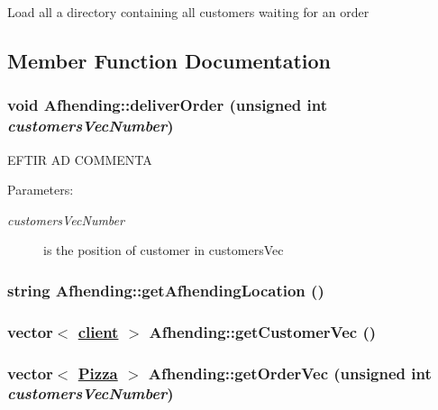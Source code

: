 Load all a directory containing all customers waiting for an order 

\subsection{Member Function Documentation}
\hypertarget{class_afhending_1d223b1559fc42935dfef28841735951}{
\subsubsection[deliverOrder]{\setlength{\rightskip}{0pt plus 5cm}void Afhending::deliver\-Order (unsigned int {\em customers\-Vec\-Number})}}
\label{class_afhending_1d223b1559fc42935dfef28841735951}


EFTIR AD  COMMENTA

\begin{Desc}
\item[Parameters:]
\begin{description}
\item[{\em customers\-Vec\-Number}]is the position of customer in customers\-Vec \end{description}
\end{Desc}
\hypertarget{class_afhending_543bc751e47e95a5382a13e161387a1b}{
\subsubsection[getAfhendingLocation]{\setlength{\rightskip}{0pt plus 5cm}string Afhending::get\-Afhending\-Location ()}}
\label{class_afhending_543bc751e47e95a5382a13e161387a1b}


\hypertarget{class_afhending_3970b0afe27b514282442b11592e1602}{
\subsubsection[getCustomerVec]{\setlength{\rightskip}{0pt plus 5cm}vector$<$ \hyperlink{classclient}{client} $>$ Afhending::get\-Customer\-Vec ()}}
\label{class_afhending_3970b0afe27b514282442b11592e1602}


\hypertarget{class_afhending_ad0cbeddec394b25c5eade57247f4110}{
\subsubsection[getOrderVec]{\setlength{\rightskip}{0pt plus 5cm}vector$<$ \hyperlink{class_pizza}{Pizza} $>$ Afhending::get\-Order\-Vec (unsigned int {\em customers\-Vec\-Number})}}
\label{class_afhending_ad0cbeddec394b25c5eade57247f4110}



